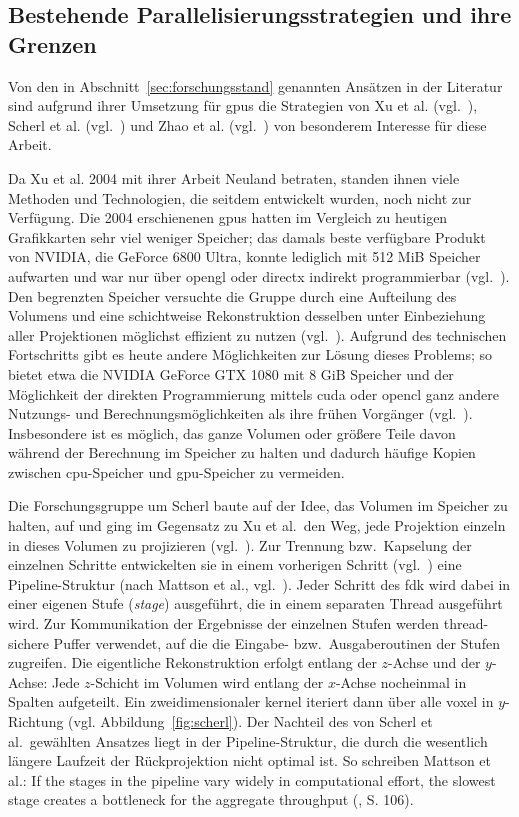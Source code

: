 \subsection{Bestehende Parallelisierungsstrategien und ihre Grenzen}\label{ssec:par_strat}

Von den in Abschnitt~\ref{sec:forschungsstand} genannten Ansätzen in der Literatur sind aufgrund ihrer Umsetzung für
\gls{gpu}s die Strategien von Xu et al. (vgl.~\cite{xumuell}), Scherl et al. (vgl.~\cite{scherlkeck}) und Zhao et al.
(vgl.~\cite{zhao}) von besonderem Interesse für diese Arbeit.

Da Xu et al. 2004 mit ihrer Arbeit Neuland betraten, standen ihnen viele Methoden und Technologien, die seitdem 
entwickelt wurden, noch nicht zur Verfügung. Die 2004 erschienenen \gls{gpu}s hatten im Vergleich zu heutigen
Grafikkarten sehr viel weniger Speicher; das damals beste verfügbare Produkt von NVIDIA, die GeForce 6800 Ultra, konnte
lediglich mit 512 MiB Speicher aufwarten und war nur über \gls{opengl} oder \gls{directx} indirekt programmierbar
(vgl.~\cite{geforce6800}). Den begrenzten Speicher versuchte die Gruppe durch eine Aufteilung des Volumens und eine
schichtweise Rekonstruktion desselben unter Einbeziehung aller Projektionen möglichst effizient zu nutzen
(vgl.~\cite{xumuell}). Aufgrund des technischen Fortschritts gibt es heute andere Möglichkeiten zur Lösung dieses
Problems; so bietet etwa die NVIDIA GeForce GTX 1080 mit 8 GiB Speicher und der Möglichkeit der direkten Programmierung
mittels \gls{cuda} oder \gls{opencl} ganz andere Nutzungs- und Berechnungsmöglichkeiten als ihre frühen Vorgänger
(vgl.~\cite{gtx1080}). Insbesondere ist es möglich, das ganze Volumen oder größere Teile davon während der Berechnung im
Speicher zu halten und dadurch häufige Kopien zwischen \gls{cpu}-Speicher und \gls{gpu}-Speicher zu vermeiden.

Die Forschungsgruppe um Scherl baute auf der Idee, das Volumen im Speicher zu halten, auf und ging im Gegensatz zu Xu et
al.\ den Weg, jede Projektion einzeln in dieses Volumen zu projizieren (vgl.~\cite{scherlkeck}). Zur Trennung bzw.\
Kapselung der einzelnen Schritte entwickelten sie in einem vorherigen Schritt (vgl.~\cite{scherlhopp}) eine
Pipeline-Struktur (nach Mattson et al., vgl.~\cite{mattsan}). Jeder Schritt des \gls{fdk} wird dabei in einer eigenen
Stufe (\textit{stage}) ausgeführt, die in einem separaten Thread ausgeführt wird. Zur Kommunikation der Ergebnisse der
einzelnen Stufen werden thread-sichere Puffer verwendet, auf die die Eingabe- bzw.\ Ausgaberoutinen der Stufen
zugreifen. Die eigentliche Rekonstruktion erfolgt entlang der $z$-Achse und der $y$-Achse: Jede $z$-Schicht im Volumen
wird entlang der $x$-Achse nocheinmal in Spalten aufgeteilt. Ein zweidimensionaler \gls{kernel} iteriert dann über alle
\gls{voxel} in $y$-Richtung (vgl. Abbildung~\ref{fig:scherl}). Der Nachteil des von Scherl et al.\ gewählten Ansatzes
liegt in der Pipeline-Struktur, die durch die wesentlich längere Laufzeit der Rückprojektion nicht optimal ist. So
schreiben Mattson et al.: {\glqq}If the stages in the pipeline vary widely in computational effort, the slowest stage
creates a bottleneck for the aggregate throughput{\grqq} (\cite{mattsan}, S. 106).

